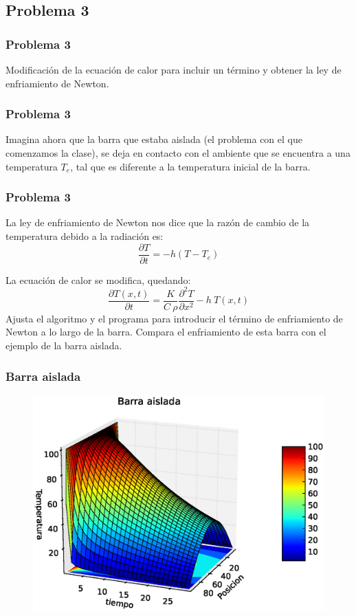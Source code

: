 \subsection{Problema 3}
\begin{frame}
\frametitle{Problema 3}
Modificación de la ecuación de calor para incluir un término y obtener la ley de enfriamiento de Newton.
\end{frame}
\begin{frame}
\frametitle{Problema 3}
Imagina ahora que la barra que estaba aislada (el problema con el que comenzamos la clase), se deja en contacto con el ambiente que se encuentra a una temperatura $T_{e}$, tal que es diferente a la temperatura inicial de la barra.
\end{frame}
\begin{frame}
\frametitle{Problema 3}
La ley de enfriamiento de Newton nos dice que la razón de cambio de la temperatura debido a la radiación es:
\[ \dfrac{\partial T}{\partial t} = - h (T- T_{e}) \]
\end{frame}
\begin{frame}
La ecuación de calor se modifica, quedando:
\[ \dfrac{\partial T(x,t)}{\partial t} = \dfrac{K}{C \: \rho} \dfrac{\partial^{2}T}{\partial x^{2}} - h \: T(x,t)\]
Ajusta el algoritmo y el programa para introducir el término de enfriamiento de Newton a lo largo de la barra. Compara el enfriamiento de esta barra con el ejemplo de la barra aislada.
\end{frame}
\begin{frame}
\frametitle{Barra aislada}
\begin{figure}
	\centering
	\includegraphics[scale=0.5]{Imagenes/EqCalor08.eps}  
\end{figure}
\end{frame}
